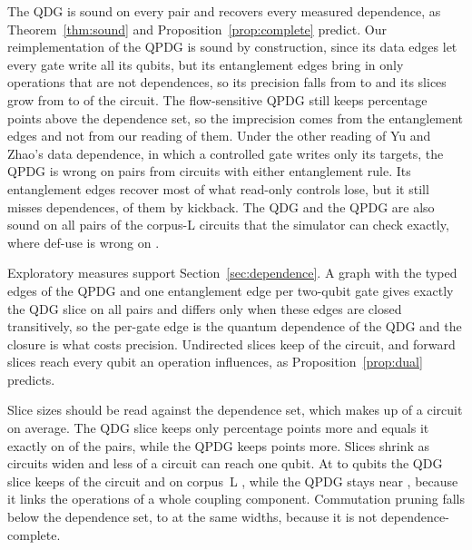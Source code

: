 The QDG is sound on every pair and recovers every measured dependence, as Theorem~\ref{thm:sound} and
Proposition~\ref{prop:complete} predict. Our reimplementation of the QPDG is sound by construction, since its
data edges let every gate write all its qubits, but its entanglement edges bring in only operations that are
not dependences, so its precision falls from \numRqOneLcPrecision{} to \numRqOneYzPrecision{} and its slices
grow from \numRqOneLcSize{} to \numRqOneYzSize{} of the circuit. The flow-sensitive QPDG still keeps
\numYzfExcess{} percentage points above the dependence set, so the imprecision comes from the entanglement
edges and not from our reading of them. Under the other reading of Yu and Zhao's data dependence, in which a
controlled gate writes only its targets, the QPDG is wrong on \numYzRoUnsound{} pairs from
\numYzRoUnsoundCircuits{} circuits with either entanglement rule. Its entanglement edges recover most of
what read-only controls lose, but it still misses \numYzRoMissed{} dependences, \numYzRoMissedKick{} of
them by kickback. The QDG and the QPDG are also sound on all \numCorpusLSoundPairs{} pairs of the
\numCorpusLSoundCircuits{} corpus-L circuits that the simulator can check exactly, where def-use is wrong
on \numCorpusLWrongDu{}.

Exploratory measures support Section~\ref{sec:dependence}. A graph with the typed edges of the QPDG and one entanglement edge per two-qubit gate gives exactly the QDG
slice on all \numFdFourEdgeNoClosureEqual{} pairs and differs only when these edges are closed
transitively, so the per-gate edge is the quantum dependence of the QDG and the closure is what costs
precision. Undirected slices keep \numFdUndSize{} of the circuit, and forward slices reach every qubit an operation
influences, as Proposition~\ref{prop:dual} predicts.

Slice sizes should be read against the dependence set, which makes up \numDepFloor{} of a circuit on
average. The QDG slice keeps only \numLcExcess{} percentage points more and equals it exactly on
\numLcExact{} of the \numNPairs{} pairs, while the QPDG keeps \numYzExcess{} points more. Slices shrink as circuits widen and less of a circuit can reach one qubit. At \numWElevenLo{} to \numWElevenHi{} qubits the QDG slice keeps \numWElevenLc{} of the
circuit and on corpus~L \numCorpusLSizeLc{}, while the QPDG stays near \numCorpusLSizeYz{}, because it links
the operations of a whole coupling component. Commutation pruning falls below the dependence set, to
\numWElevenLcq{} at the same widths, because it is not dependence-complete.

